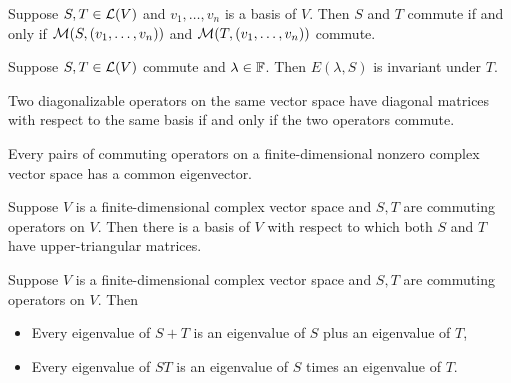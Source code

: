 \documentclass{extarticle}
\begin{document}
\begin{lemma}
    Suppose \(S, T \in \mathcal{L}(V)\) and \(v_1, \ldots, v_n\) is a basis of \(V\). Then \(S\) and \(T\)
    commute if and only if \(\mathcal{M}(S, (v_1, \ldots, v_n))\) and \(\mathcal{M}(T, (v_1, \ldots, v_n))\) commute.
\end{lemma}

\begin{lemma}
    Suppose \(S, T \in \mathcal{L}(V)\) commute and \(\lambda \in \mathbb{F}\). Then 
    \(E(\lambda, S)\) is invariant under \(T\).
\end{lemma}

\begin{thm}
    Two diagonalizable operators on the same vector space have diagonal matrices with 
    respect to the same basis if and only if the two operators commute.
\end{thm}

\begin{lemma}
    Every pairs of commuting operators on a finite-dimensional nonzero complex vector space has 
    a common eigenvector.
\end{lemma}

\begin{lemma}
    Suppose \(V\) is a finite-dimensional complex vector space and \(S, T\) are commuting operators on 
    \(V\). Then there is a basis of \(V\) with respect to which both 
    \(S\) and \(T\) have upper-triangular matrices. 
\end{lemma}

\begin{thm}
    Suppose \(V\) is a finite-dimensional complex vector space and \(S, T\) are commuting operators 
    on \(V\). Then 
    \begin{itemize}
        \item Every eigenvalue of \(S + T\) is an eigenvalue of \(S\) plus an eigenvalue of \(T\), 
        \item Every eigenvalue of \(ST\) is an eigenvalue of \(S\) times an eigenvalue of \(T\).
    \end{itemize}
\end{thm}

\end{document}
